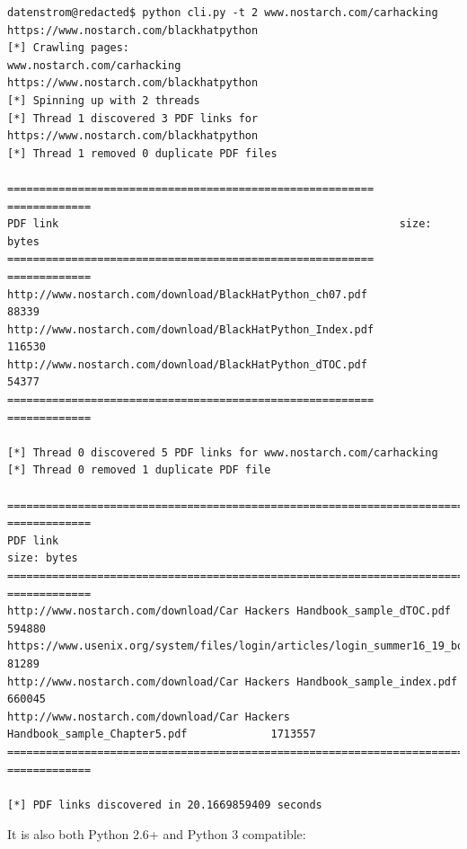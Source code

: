 \documentclass[12pt, a4paper]{article}
\begin{document}
\begin{minipage}{\linewidth} %
\vspace{2em}
\begin{verbatim}
datenstrom@redacted$ python cli.py -t 2 www.nostarch.com/carhacking https://www.nostarch.com/blackhatpython
[*] Crawling pages:
www.nostarch.com/carhacking
https://www.nostarch.com/blackhatpython
[*] Spinning up with 2 threads
[*] Thread 1 discovered 3 PDF links for https://www.nostarch.com/blackhatpython
[*] Thread 1 removed 0 duplicate PDF files

=========================================================  =============
PDF link                                                     size: bytes
=========================================================  =============
http://www.nostarch.com/download/BlackHatPython_ch07.pdf           88339
http://www.nostarch.com/download/BlackHatPython_Index.pdf         116530
http://www.nostarch.com/download/BlackHatPython_dTOC.pdf           54377
=========================================================  =============

[*] Thread 0 discovered 5 PDF links for www.nostarch.com/carhacking
[*] Thread 0 removed 1 duplicate PDF file

==============================================================================  =============
PDF link                                                                          size: bytes
==============================================================================  =============
http://www.nostarch.com/download/Car Hackers Handbook_sample_dTOC.pdf                  594880
https://www.usenix.org/system/files/login/articles/login_summer16_19_books.pdf          81289
http://www.nostarch.com/download/Car Hackers Handbook_sample_index.pdf                 660045
http://www.nostarch.com/download/Car Hackers Handbook_sample_Chapter5.pdf             1713557
==============================================================================  =============

[*] PDF links discovered in 20.1669859409 seconds
\end{verbatim}
\vspace{2em}
\end{minipage}


\newpage
It is also both Python 2.6+ and Python 3 compatible:
\end{document}
